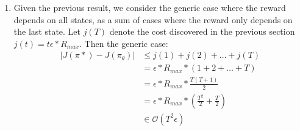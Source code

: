 \documentclass[11pt]{article}
\begin{document}
\begin{enumerate}
\begin{enumerate}
        \item Given the previous result, we consider the generic case where the reward depends on all states, as a sum of cases where the reward only depends on the last state.
        Let $j(T)$ denote the cost discovered in the previous section $j(t) = t \epsilon * R_{max}$.  Then the generic case:
        \begin{align*}
            |J(\pi*) - J(\pi_\theta)| &\leq j(1) + j(2) + \dots + j(T)\\
            &= \epsilon * R_{max} * (1 + 2 + \dots + T)\\
            &= \epsilon * R_{max} * \frac{T(T+1)}{2}\\
            &= \epsilon * R_{max} * \left(\frac{T^2}{2} + \frac{T}{2} \right)\\
            &\in \mathcal{O}(T^2 \epsilon)    
        \end{align*}

        

    \end{enumerate}


    
\end{enumerate}
\end{document}
